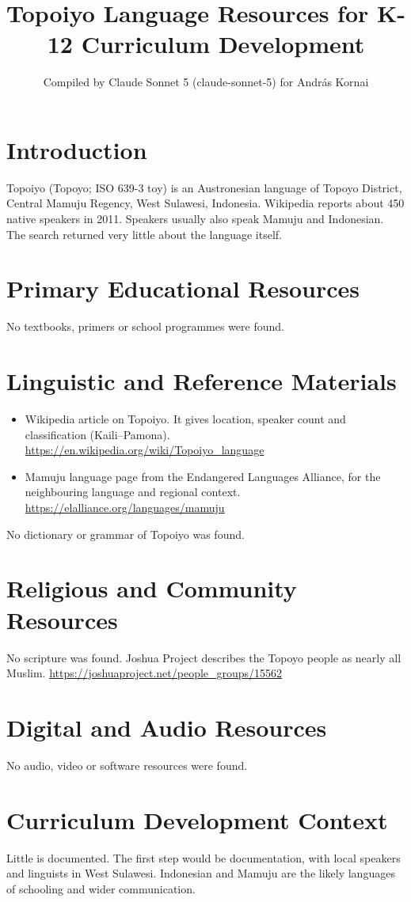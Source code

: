 \documentclass[12pt]{article}
\title{Topoiyo Language Resources for K-12 Curriculum Development}
\author{Compiled by Claude Sonnet 5 (claude-sonnet-5) for Andr\'as Kornai}
\date{}
\begin{document}
\maketitle

\section{Introduction}
Topoiyo (Topoyo; ISO 639-3 toy) is an Austronesian language of Topoyo District, Central Mamuju Regency, West Sulawesi, Indonesia. Wikipedia reports about 450 native speakers in 2011. Speakers usually also speak Mamuju and Indonesian. The search returned very little about the language itself.

\section{Primary Educational Resources}
No textbooks, primers or school programmes were found.

\section{Linguistic and Reference Materials}
\begin{itemize}
\item Wikipedia article on Topoiyo. It gives location, speaker count and classification (Kaili--Pamona). \url{https://en.wikipedia.org/wiki/Topoiyo_language}
\item Mamuju language page from the Endangered Languages Alliance, for the neighbouring language and regional context. \url{https://elalliance.org/languages/mamuju}
\end{itemize}
No dictionary or grammar of Topoiyo was found.

\section{Religious and Community Resources}
No scripture was found. Joshua Project describes the Topoyo people as nearly all Muslim. \url{https://joshuaproject.net/people_groups/15562}

\section{Digital and Audio Resources}
No audio, video or software resources were found.

\section{Curriculum Development Context}
Little is documented. The first step would be documentation, with local speakers and linguists in West Sulawesi. Indonesian and Mamuju are the likely languages of schooling and wider communication.
\end{document}
